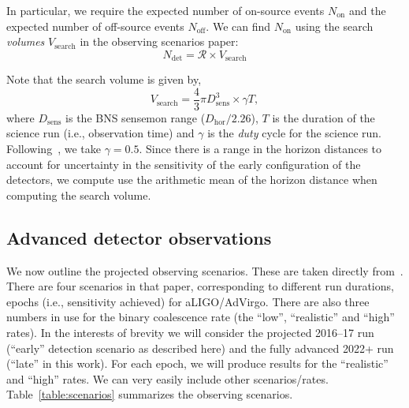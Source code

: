 \documentclass[twocolumn,nofootinbib]{revtex4-1}
\newcommand{\cbcrate}{{{\mathcal R}}}
\begin{document}
In particular, we require the expected number of on-source events
$N_{\mathrm{on}}$ and the expected number of off-source events
$N_{\mathrm{off}}$.  We can find $N_{\mathrm{on}}$ using the search
\emph{volumes} $V_{\mathrm{search}}$ in the observing scenarios paper:
%
\begin{equation}
N_{\mathrm{det}} = \cbcrate \times V_{\mathrm{search}}
\end{equation}



Note that the search volume is given by,
\begin{equation}\label{eq:search_volume}
V_{\mathrm{search}} = \frac{4}{3}\pi D_{\mathrm{sens}}^3 \times \gamma T,
\end{equation}
%
where $D_{\mathrm{sens}}$ is the BNS sensemon range ($D_{\mathrm{hor}}/2.26$),
$T$ is the duration of the science run (i.e., observation time) and $\gamma$ is
the \emph{duty} cycle for the science run.  Following~\cite{ade_prospects}, we
take $\gamma=0.5$.  Since there is a range in the horizon distances to account
for uncertainty in the sensitivity of the early configuration of the detectors,
we compute use the arithmetic mean of the horizon distance when computing the
search volume.

\subsection{Advanced detector observations}
We now outline the projected observing scenarios.  These are taken directly
from~\cite{ade_prospects}.  There are four scenarios in that paper,
corresponding to different run durations, epochs (i.e., sensitivity achieved)
for aLIGO/AdVirgo.  There are also three numbers in use for the binary
coalescence rate (the ``low'', ``realistic'' and ``high'' rates).  In the
interests of brevity we will consider the projected 2016--17 run (``early''
detection scenario as described here) and the fully advanced 2022+ run (``late''
in this work).  For each epoch, we will produce results for the ``realistic''
and ``high'' rates.   We can very easily include other scenarios/rates.
Table~\ref{table:scenarios} summarizes the observing scenarios.
\end{document}
